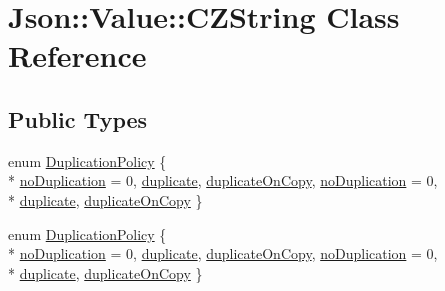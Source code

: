 \hypertarget{classJson_1_1Value_1_1CZString}{\section{Json\-:\-:Value\-:\-:C\-Z\-String Class Reference}
\label{de/d6e/classJson_1_1Value_1_1CZString}
}
\subsection*{Public Types}
\begin{DoxyCompactItemize}
\item 
enum \hyperlink{classJson_1_1Value_1_1CZString_a2805c46fb4a72bbaed55de6d75941b6d}{Duplication\-Policy} \{ \\*
\hyperlink{classJson_1_1Value_1_1CZString_a2805c46fb4a72bbaed55de6d75941b6dabe3c3619eac7dc5d5146dbd99007142e}{no\-Duplication} = 0, 
\hyperlink{classJson_1_1Value_1_1CZString_a2805c46fb4a72bbaed55de6d75941b6da9bba1ee215b6afaba961f403fa6605f5}{duplicate}, 
\hyperlink{classJson_1_1Value_1_1CZString_a2805c46fb4a72bbaed55de6d75941b6da7475312715c35dc630985fc2d8ce4095}{duplicate\-On\-Copy}, 
\hyperlink{classJson_1_1Value_1_1CZString_a2805c46fb4a72bbaed55de6d75941b6dabe3c3619eac7dc5d5146dbd99007142e}{no\-Duplication} = 0, 
\\*
\hyperlink{classJson_1_1Value_1_1CZString_a2805c46fb4a72bbaed55de6d75941b6da9bba1ee215b6afaba961f403fa6605f5}{duplicate}, 
\hyperlink{classJson_1_1Value_1_1CZString_a2805c46fb4a72bbaed55de6d75941b6da7475312715c35dc630985fc2d8ce4095}{duplicate\-On\-Copy}
 \}
\item 
enum \hyperlink{classJson_1_1Value_1_1CZString_a2805c46fb4a72bbaed55de6d75941b6d}{Duplication\-Policy} \{ \\*
\hyperlink{classJson_1_1Value_1_1CZString_a2805c46fb4a72bbaed55de6d75941b6dabe3c3619eac7dc5d5146dbd99007142e}{no\-Duplication} = 0, 
\hyperlink{classJson_1_1Value_1_1CZString_a2805c46fb4a72bbaed55de6d75941b6da9bba1ee215b6afaba961f403fa6605f5}{duplicate}, 
\hyperlink{classJson_1_1Value_1_1CZString_a2805c46fb4a72bbaed55de6d75941b6da7475312715c35dc630985fc2d8ce4095}{duplicate\-On\-Copy}, 
\hyperlink{classJson_1_1Value_1_1CZString_a2805c46fb4a72bbaed55de6d75941b6dabe3c3619eac7dc5d5146dbd99007142e}{no\-Duplication} = 0, 
\\*
\hyperlink{classJson_1_1Value_1_1CZString_a2805c46fb4a72bbaed55de6d75941b6da9bba1ee215b6afaba961f403fa6605f5}{duplicate}, 
\hyperlink{classJson_1_1Value_1_1CZString_a2805c46fb4a72bbaed55de6d75941b6da7475312715c35dc630985fc2d8ce4095}{duplicate\-On\-Copy}
 \}
\end{DoxyCompactItemize}
